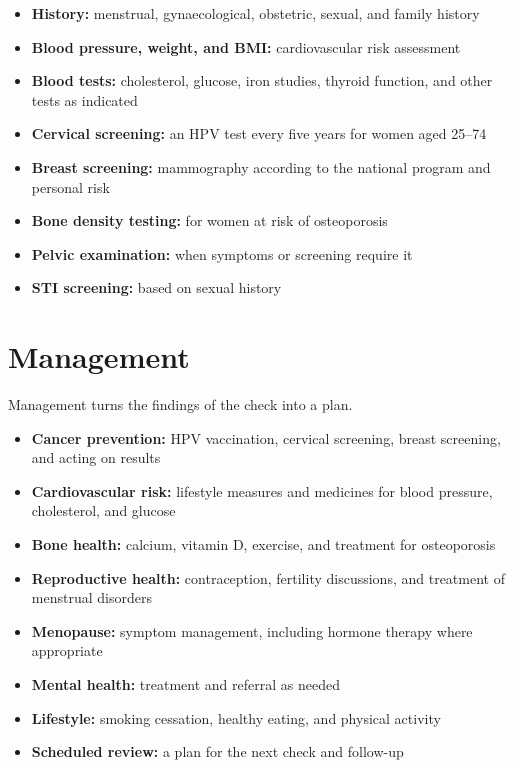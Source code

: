 \begin{itemize}
    \item \textbf{History:} menstrual, gynaecological, obstetric, sexual, and family history
    \item \textbf{Blood pressure, weight, and BMI:} cardiovascular risk assessment
    \item \textbf{Blood tests:} cholesterol, glucose, iron studies, thyroid function, and other tests as indicated
    \item \textbf{Cervical screening:} an HPV test every five years for women aged 25--74
    \item \textbf{Breast screening:} mammography according to the national program and personal risk
    \item \textbf{Bone density testing:} for women at risk of osteoporosis
    \item \textbf{Pelvic examination:} when symptoms or screening require it
    \item \textbf{STI screening:} based on sexual history
\end{itemize}

\section*{Management}
Management turns the findings of the check into a plan.

\begin{itemize}
    \item \textbf{Cancer prevention:} HPV vaccination, cervical screening, breast screening, and acting on results
    \item \textbf{Cardiovascular risk:} lifestyle measures and medicines for blood pressure, cholesterol, and glucose
    \item \textbf{Bone health:} calcium, vitamin D, exercise, and treatment for osteoporosis
    \item \textbf{Reproductive health:} contraception, fertility discussions, and treatment of menstrual disorders
    \item \textbf{Menopause:} symptom management, including hormone therapy where appropriate
    \item \textbf{Mental health:} treatment and referral as needed
    \item \textbf{Lifestyle:} smoking cessation, healthy eating, and physical activity
    \item \textbf{Scheduled review:} a plan for the next check and follow-up
\end{itemize}


